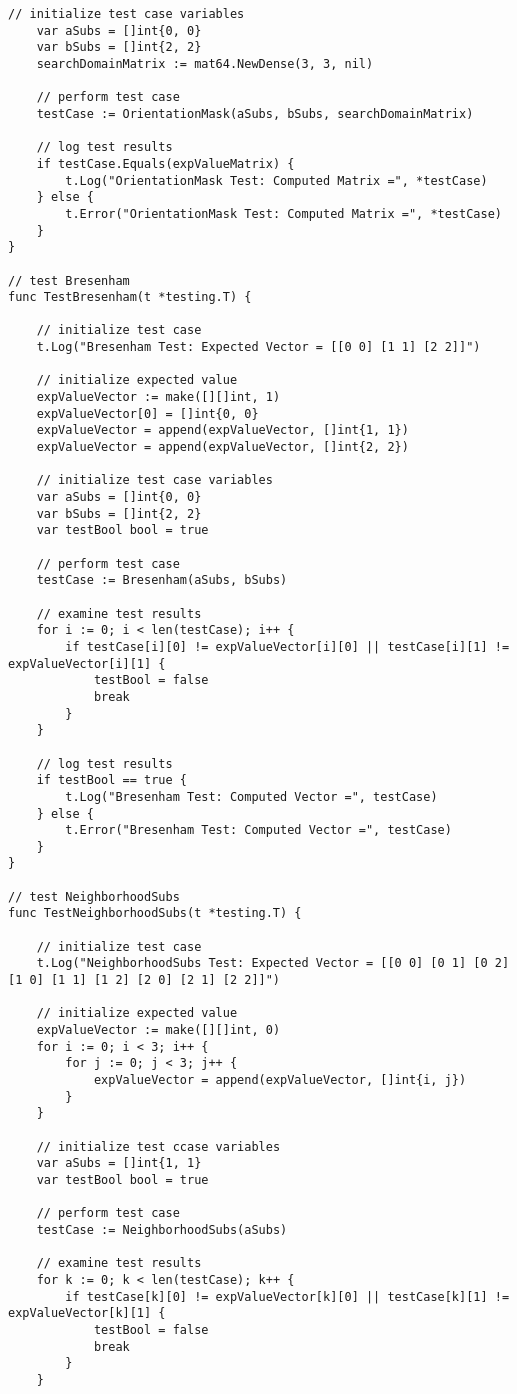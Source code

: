 \begin{lstlisting}[basicstyle=\tiny]
	// initialize test case variables
	var aSubs = []int{0, 0}
	var bSubs = []int{2, 2}
	searchDomainMatrix := mat64.NewDense(3, 3, nil)

	// perform test case
	testCase := OrientationMask(aSubs, bSubs, searchDomainMatrix)

	// log test results
	if testCase.Equals(expValueMatrix) {
		t.Log("OrientationMask Test: Computed Matrix =", *testCase)
	} else {
		t.Error("OrientationMask Test: Computed Matrix =", *testCase)
	}
}

// test Bresenham
func TestBresenham(t *testing.T) {

	// initialize test case
	t.Log("Bresenham Test: Expected Vector = [[0 0] [1 1] [2 2]]")

	// initialize expected value
	expValueVector := make([][]int, 1)
	expValueVector[0] = []int{0, 0}
	expValueVector = append(expValueVector, []int{1, 1})
	expValueVector = append(expValueVector, []int{2, 2})

	// initialize test case variables
	var aSubs = []int{0, 0}
	var bSubs = []int{2, 2}
	var testBool bool = true

	// perform test case
	testCase := Bresenham(aSubs, bSubs)

	// examine test results
	for i := 0; i < len(testCase); i++ {
		if testCase[i][0] != expValueVector[i][0] || testCase[i][1] != expValueVector[i][1] {
			testBool = false
			break
		}
	}

	// log test results
	if testBool == true {
		t.Log("Bresenham Test: Computed Vector =", testCase)
	} else {
		t.Error("Bresenham Test: Computed Vector =", testCase)
	}
}

// test NeighborhoodSubs
func TestNeighborhoodSubs(t *testing.T) {

	// initialize test case
	t.Log("NeighborhoodSubs Test: Expected Vector = [[0 0] [0 1] [0 2] [1 0] [1 1] [1 2] [2 0] [2 1] [2 2]]")

	// initialize expected value
	expValueVector := make([][]int, 0)
	for i := 0; i < 3; i++ {
		for j := 0; j < 3; j++ {
			expValueVector = append(expValueVector, []int{i, j})
		}
	}

	// initialize test ccase variables
	var aSubs = []int{1, 1}
	var testBool bool = true

	// perform test case
	testCase := NeighborhoodSubs(aSubs)

	// examine test results
	for k := 0; k < len(testCase); k++ {
		if testCase[k][0] != expValueVector[k][0] || testCase[k][1] != expValueVector[k][1] {
			testBool = false
			break
		}
	}


\end{lstlisting}
